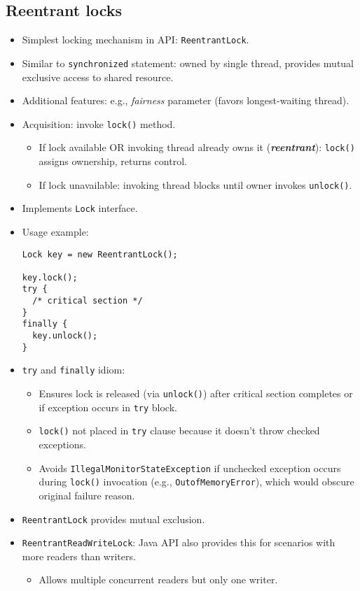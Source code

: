 \subsection{Reentrant locks}
\begin{itemize}
    \item Simplest locking mechanism in API: \texttt{ReentrantLock}.
    \item Similar to \texttt{synchronized} statement: owned by single thread, provides mutual exclusive access to shared resource.
    \item Additional features: e.g., \textit{fairness} parameter (favors longest-waiting thread).
    \item Acquisition: invoke \texttt{lock()} method.
    \begin{itemize}
        \item If lock available OR invoking thread already owns it (\textbf{\textit{reentrant}}): \texttt{lock()} assigns ownership, returns control.
        \item If lock unavailable: invoking thread blocks until owner invokes \texttt{unlock()}.
    \end{itemize}
    \item Implements \texttt{Lock} interface.
    \item Usage example:
    \begin{verbatim}
Lock key = new ReentrantLock();
 
key.lock();
try {
  /* critical section */
}
finally {
  key.unlock();
}
    \end{verbatim}
    \item \texttt{try} and \texttt{finally} idiom:
    \begin{itemize}
        \item Ensures lock is released (via \texttt{unlock()}) after critical section completes or if exception occurs in \texttt{try} block.
        \item \texttt{lock()} not placed in \texttt{try} clause because it doesn't throw checked exceptions.
        \item Avoids \texttt{IllegalMonitorStateException} if unchecked exception occurs during \texttt{lock()} invocation (e.g., \texttt{OutofMemoryError}), which would obscure original failure reason.
    \end{itemize}
    \item \texttt{ReentrantLock} provides mutual exclusion.
    \item \texttt{ReentrantReadWriteLock}: Java API also provides this for scenarios with more readers than writers.
    \begin{itemize}
        \item Allows multiple concurrent readers but only one writer.
    \end{itemize}
\end{itemize}

